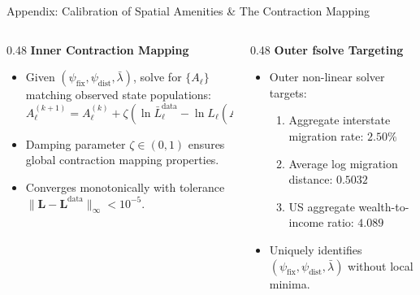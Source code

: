 \documentclass[aspectratio=169, 10pt]{beamer}
\begin{document}
\begin{frame}{Appendix: Calibration of Spatial Amenities \& The Contraction Mapping \hfill \hyperlink{main:calibration}{\scriptsize{}}}\label{backup:amenity_contraction}
    \begin{columns}[T]
        \begin{column}{0.48\textwidth}
            \textbf{\small Inner Contraction Mapping}
            \vspace{0.05cm}
            \begin{itemize}\scriptsize\setlength{\itemsep}{2pt}
                \item Given $(\psi_{\text{fix}}, \psi_{\text{dist}}, \bar{\lambda})$, solve for $\{A_\ell\}$ matching observed state populations:
                $$A_\ell^{(k+1)} = A_\ell^{(k)} + \zeta \left( \ln \bar{L}_\ell^{\text{data}} - \ln L_\ell\left(\mathbf{A}^{(k)}\right) \right)$$
                \item Damping parameter $\zeta \in (0, 1)$ ensures global contraction mapping properties.
                \item Converges monotonically with tolerance $\|\mathbf{L} - \mathbf{L}^{\text{data}}\|_\infty < 10^{-5}$.
            \end{itemize}
        \end{column}
        \begin{column}{0.48\textwidth}
            \textbf{\small Outer fsolve Targeting}
            \vspace{0.05cm}
            \begin{itemize}\scriptsize\setlength{\itemsep}{2pt}
                \item Outer non-linear solver targets:
                \begin{enumerate}\tiny\setlength{\itemsep}{1pt}
                    \item Aggregate interstate migration rate: $2.50\%$
                    \item Average log migration distance: $0.5032$
                    \item US aggregate wealth-to-income ratio: $4.089$
                \end{enumerate}
                \item Uniquely identifies $(\psi_{\text{fix}}, \psi_{\text{dist}}, \bar{\lambda})$ without local minima.
            \end{itemize}
        \end{column}
    \end{columns}
\end{frame}
\end{document}

